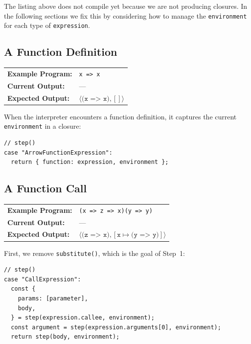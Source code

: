 \documentclass[12pt, oneside]{book}
\begin{document}
The listing above does not compile yet because we are not producing closures. In the following sections we fix this by considering how to manage the \texttt{environment} for each type of \texttt{expression}.

\subsection{A Function Definition}

\begin{center}
\begin{tabular}{ll}
\textbf{Example Program:} & \texttt{x => x} \\
\textbf{Current Output:} & — \\
\textbf{Expected Output:} & $\langle \texttt{(x => x)}, [] \rangle$ \\
\end{tabular}
\end{center}

When the interpreter encounters a function definition, it captures the current \texttt{environment} in a closure:

\begin{verbatim}
// step()
case "ArrowFunctionExpression":
  return { function: expression, environment };
\end{verbatim}

\subsection{A Function Call}
\label{A Function Call}

\begin{center}
\begin{tabular}{ll}
\textbf{Example Program:} & \texttt{(x => z => x)(y => y)} \\
\textbf{Current Output:} & — \\
\textbf{Expected Output:} & $\langle \texttt{(z => x)}, [\texttt{x} \mapsto \texttt{(y => y)}] \rangle$ \\
\end{tabular}
\end{center}

First, we remove \texttt{substitute()}, which is the goal of Step~1:

\begin{verbatim}
// step()
case "CallExpression":
  const {
    params: [parameter],
    body,
  } = step(expression.callee, environment);
  const argument = step(expression.arguments[0], environment);
  return step(body, environment);
\end{verbatim}
\end{document}

